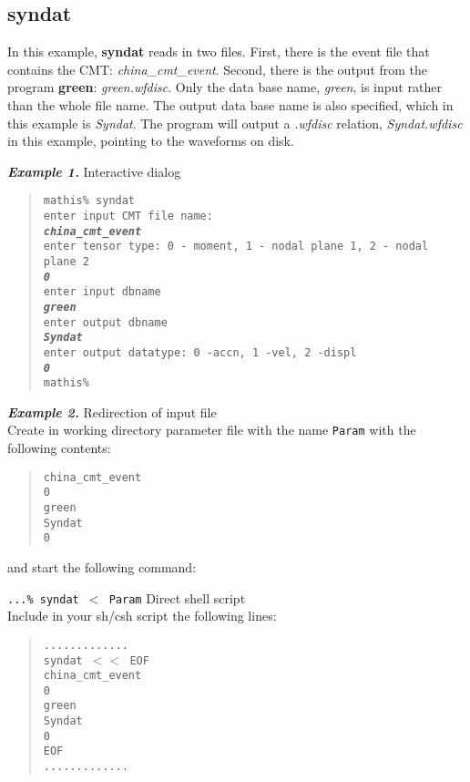 \subsection{syndat}

In this example, {\bf syndat} reads in two files. First, there is the event file that
contains the CMT: {\it china\_cmt\_event}. Second, there is the output from the program
{\bf green}: {\it green.wfdisc}. Only the data base name, {\it green}, is input rather
than the whole file name. The output data base name is also specified, which in this
example is {\it Syndat}. The program will output a {\it .wfdisc} relation, {\it Syndat.wfdisc}
in this example, pointing to the waveforms on disk.


{\bf\emph{Example 1.}} Interactive dialog
\begin{quote}
\texttt{mathis\% syndat \\
enter input CMT file name: \\
{\bf \emph{china\_cmt\_event}} \\
enter tensor type: 0 - moment, 1 - nodal plane 1, 2 - nodal plane 2 \\
{\bf \emph{0}} \\
enter input dbname \\
{\bf \emph{green}} \\
enter output dbname \\
{\bf \emph{Syndat}} \\
enter output datatype: 0 -accn, 1 -vel, 2 -displ \\
{\bf \emph{0}} \\
mathis\%  }
\end{quote}
{\bf\emph{Example 2.}} Redirection of input file \\
Create in working directory parameter file with the name {\tt Param} with
the following contents:
\begin{quote}
\texttt{china\_cmt\_event \\
0 \\
green \\
Syndat \\
0}
\end{quote}
and start the following command:

\texttt{...\% syndat $<$ Param}
\newpage
{} Direct shell script \\
Include in your sh/csh script the following lines:
\begin{quote}
\texttt{............. \\
syndat $<<$ EOF \\
china\_cmt\_event \\
0 \\
green \\
Syndat \\
0 \\
EOF \\
............. }
\end{quote}
